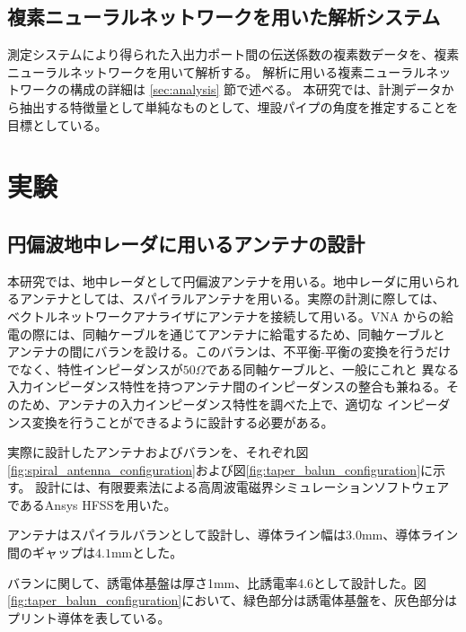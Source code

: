 \documentclass[11pt,a4paper,uplatex]{ujarticle}
\begin{document}
  \newpage

  \subsection{複素ニューラルネットワークを用いた解析システム}

    測定システムにより得られた入出力ポート間の伝送係数の複素数データを、複素ニューラルネットワークを用いて解析する。
    解析に用いる複素ニューラルネットワークの構成の詳細は \ref{sec:analysis} 節で述べる。
    本研究では、計測データから抽出する特徴量として単純なものとして、埋設パイプの角度を推定することを目標としている。

\section{実験}

  \subsection{円偏波地中レーダに用いるアンテナの設計}

  本研究では、地中レーダとして円偏波アンテナを用いる。地中レーダに用いられるアンテナとしては、スパイラルアンテナを用いる。実際の計測に際しては、
  ベクトルネットワークアナライザにアンテナを接続して用いる。VNA からの給電の際には、同軸ケーブルを通じてアンテナに給電するため、同軸ケーブルと
  アンテナの間にバランを設ける。このバランは、不平衡-平衡の変換を行うだけでなく、特性インピーダンスが$50\Omega$である同軸ケーブルと、一般にこれと
  異なる入力インピーダンス特性を持つアンテナ間のインピーダンスの整合も兼ねる。そのため、アンテナの入力インピーダンス特性を調べた上で、適切な
  インピーダンス変換を行うことができるように設計する必要がある。

  実際に設計したアンテナおよびバランを、それぞれ図\ref{fig:spiral_antenna_configuration}および図\ref{fig:taper_balun_configuration}に示す。
  設計には、有限要素法による高周波電磁界シミュレーションソフトウェアであるAnsys HFSSを用いた。

  アンテナはスパイラルバランとして設計し、導体ライン幅は$3.0\mathrm{mm}$、導体ライン間のギャップは$4.1\mathrm{mm}$とした。
  
  バランに関して、誘電体基盤は厚さ1mm、比誘電率4.6として設計した。図\ref{fig:taper_balun_configuration}において、緑色部分は誘電体基盤を、灰色部分は
  プリント導体を表している。

\end{document}
